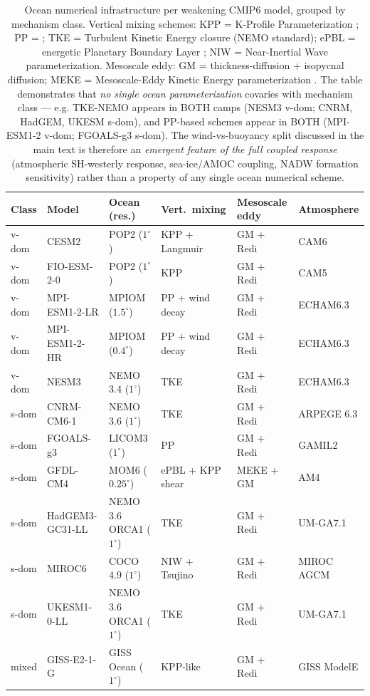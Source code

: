 \documentclass[10pt,a4paper]{article}
\begin{document}
\begin{table}[h]
\centering
\footnotesize
\caption{Ocean numerical infrastructure per weakening CMIP6 model, grouped by mechanism class. Vertical mixing schemes: KPP = K-Profile Parameterization \citep{Large1994}; PP = \citet{PacanowskiPhilander1981}; TKE = Turbulent Kinetic Energy closure (NEMO standard); ePBL = energetic Planetary Boundary Layer \citep{ReichlHallberg2018}; NIW = Near-Inertial Wave parameterization. Mesoscale eddy: GM = \citet{GentMcWilliams1990} thickness-diffusion + \citet{Redi1982} isopycnal diffusion; MEKE = Mesoscale-Eddy Kinetic Energy parameterization \citep{Jansen2015}. The table demonstrates that \emph{no single ocean parameterization} covaries with mechanism class --- e.g. TKE-NEMO appears in BOTH camps (NESM3 v-dom; CNRM, HadGEM, UKESM s-dom), and PP-based schemes appear in BOTH (MPI-ESM1-2 v-dom; FGOALS-g3 s-dom). The wind-vs-buoyancy split discussed in the main text is therefore an \emph{emergent feature of the full coupled response} (atmospheric SH-westerly response, sea-ice/AMOC coupling, NADW formation sensitivity) rather than a property of any single ocean numerical scheme.}
\label{tab:smile_components}
\begin{tabular}{l l l l l l}
\toprule
\textbf{Class} & \textbf{Model} & \textbf{Ocean (res.)} & \textbf{Vert.\ mixing} & \textbf{Mesoscale eddy} & \textbf{Atmosphere} \\
\midrule
v-dom & CESM2          & POP2 ($1^\circ$)    & KPP + Langmuir & GM + Redi & CAM6 \\
v-dom & FIO-ESM-2-0    & POP2 ($1^\circ$)    & KPP            & GM + Redi & CAM5 \\
v-dom & MPI-ESM1-2-LR  & MPIOM ($1.5^\circ$) & PP + wind decay& GM + Redi & ECHAM6.3 \\
v-dom & MPI-ESM1-2-HR  & MPIOM ($0.4^\circ$) & PP + wind decay& GM + Redi & ECHAM6.3 \\
v-dom & NESM3          & NEMO 3.4 ($1^\circ$) & TKE           & GM + Redi & ECHAM6.3 \\
\midrule
s-dom & CNRM-CM6-1       & NEMO 3.6 ($1^\circ$)        & TKE        & GM + Redi    & ARPEGE 6.3 \\
s-dom & FGOALS-g3        & LICOM3 ($1^\circ$)          & PP         & GM + Redi    & GAMIL2 \\
s-dom & GFDL-CM4         & MOM6 ($0.25^\circ$)         & ePBL + KPP shear & MEKE + GM & AM4 \\
s-dom & HadGEM3-GC31-LL  & NEMO 3.6 ORCA1 ($1^\circ$)  & TKE        & GM + Redi    & UM-GA7.1 \\
s-dom & MIROC6           & COCO 4.9 ($1^\circ$)        & NIW + Tsujino & GM + Redi & MIROC AGCM \\
s-dom & UKESM1-0-LL      & NEMO 3.6 ORCA1 ($1^\circ$)  & TKE        & GM + Redi    & UM-GA7.1 \\
\midrule
mixed & GISS-E2-1-G    & GISS Ocean ($1^\circ$) & KPP-like   & GM + Redi    & GISS ModelE \\
\bottomrule
\end{tabular}
\end{table}
\end{document}
